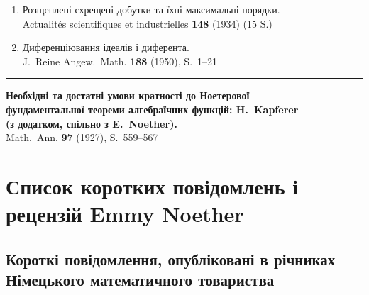 \documentclass[11pt]{article}
\newcommand{\foreign}[1]{#1}
\begin{document}
\begin{enumerate}[label={\small\arabic*.},leftmargin=2em,itemsep=0.3em]
\item Розщеплені схрещені добутки та їхні максимальні порядки.\\
\foreign{Actualités scientifiques et industrielles} \textbf{148} (1934) (15 S.)

\item Диференціювання ідеалів і диферента.\\
\foreign{J.\ Reine Angew.\ Math.} \textbf{188} (1950), S.~1--21
\end{enumerate}

\vspace{1em}
\noindent\rule{\textwidth}{0.4pt}
\vspace{0.5em}

\noindent\textbf{Необхідні та достатні умови кратності до Ноетерової}\\
\textbf{фундаментальної теореми алгебраїчних функцій: H.\ Kapferer}\\
\textbf{(з додатком, спільно з E.\ Noether).}\\
\foreign{Math.\ Ann.} \textbf{97} (1927), S.~559--567

\newpage
\section*{Список коротких повідомлень і рецензій Emmy Noether}

\subsection*{Короткі повідомлення, опубліковані в річниках Німецького математичного товариства}
\end{document}
